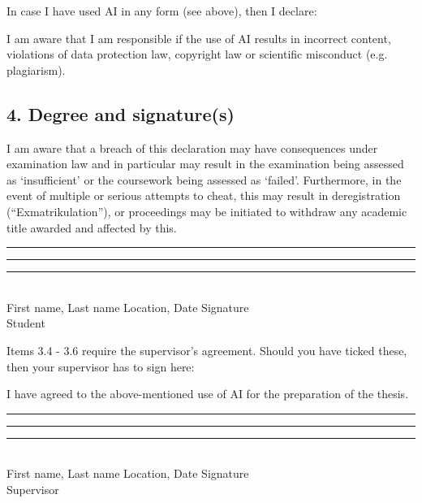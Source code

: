 {        In case I have used AI in any form (see above), then I declare:\par
        \vspace{0.5em}
        I am aware that I am responsible if the use of AI results in incorrect content, violations of data protection law, copyright law or scientific misconduct (e.g. plagiarism).

        \subsection*{4. Degree and signature(s)}
        I am aware that a breach of this declaration may have consequences under examination law and in particular may result in the examination being assessed as ‘insufficient’ or the coursework being assessed as ‘failed’. Furthermore, in the event of multiple or serious attempts to cheat, this may result in deregistration (“Exmatrikulation”), or proceedings may be initiated to withdraw any academic title awarded and affected by this.

        \vspace{1.5cm}
        \noindent
        \rule{5cm}{0.4pt} \hfill \rule{4cm}{0.4pt} \hfill \rule{5cm}{0.4pt} \\
        First name, Last name \hfill Location, Date \hfill Signature \\
        Student

        \vspace{1cm}
        \noindent
        Items 3.4 - 3.6 require the supervisor’s agreement. Should you have ticked these, then your supervisor has to sign here:\par
        \vspace{0.5em}
        I have agreed to the above-mentioned use of AI for the preparation of the thesis.

        \vspace{1.5cm}
        \noindent
        \rule{5cm}{0.4pt} \hfill \rule{4cm}{0.4pt} \hfill \rule{5cm}{0.4pt} \\
        First name, Last name \hfill Location, Date \hfill Signature \\
        Supervisor
    \fi
    \clearpage
}
